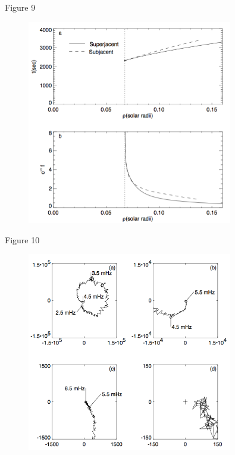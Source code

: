 \documentclass{beamer}
\begin{document}
\begin{frame}{Figure 9}
    \begin{figure}
        \includegraphics[width=0.8\textwidth]{fig_9.png}
    \end{figure}
\end{frame}

\begin{frame}{Figure 10}
    \begin{figure}
        \includegraphics[width=0.8\textwidth]{fig_10.png}
    \end{figure}
\end{frame}
\end{document}
